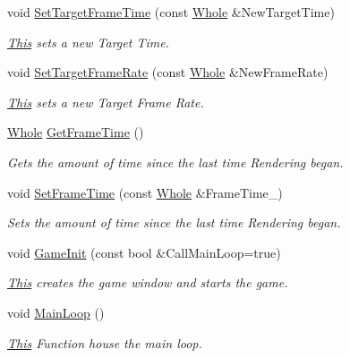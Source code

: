 \begin{DoxyCompactItemize}
void \hyperlink{classphys_1_1World_ad95b5a5ad73e0a05826b5bd834876333}{SetTargetFrameTime} (const \hyperlink{namespacephys_a460f6bc24c8dd347b05e0366ae34f34a}{Whole} \&NewTargetTime)
\begin{DoxyCompactList}\small\item\em \hyperlink{structThis}{This} sets a new Target Time. \item\end{DoxyCompactList}\item 
void \hyperlink{classphys_1_1World_a76dfcde35392291aafd6eb1a64b3c95c}{SetTargetFrameRate} (const \hyperlink{namespacephys_a460f6bc24c8dd347b05e0366ae34f34a}{Whole} \&NewFrameRate)
\begin{DoxyCompactList}\small\item\em \hyperlink{structThis}{This} sets a new Target Frame Rate. \item\end{DoxyCompactList}\item 
\hyperlink{namespacephys_a460f6bc24c8dd347b05e0366ae34f34a}{Whole} \hyperlink{classphys_1_1World_a348cebf8f15202a9916ac1b2400c63b1}{GetFrameTime} ()
\begin{DoxyCompactList}\small\item\em Gets the amount of time since the last time Rendering began. \item\end{DoxyCompactList}\item 
void \hyperlink{classphys_1_1World_a0168122baeb30d4b90ddecdda46c8fea}{SetFrameTime} (const \hyperlink{namespacephys_a460f6bc24c8dd347b05e0366ae34f34a}{Whole} \&FrameTime\_\-)
\begin{DoxyCompactList}\small\item\em Sets the amount of time since the last time Rendering began. \item\end{DoxyCompactList}\item 
void \hyperlink{classphys_1_1World_a21cc36be08a61f40619584d4c438936b}{GameInit} (const bool \&CallMainLoop=true)
\begin{DoxyCompactList}\small\item\em \hyperlink{structThis}{This} creates the game window and starts the game. \item\end{DoxyCompactList}\item 
void \hyperlink{classphys_1_1World_af1d9e36d43f5e50543fa2351a32c8362}{MainLoop} ()
\begin{DoxyCompactList}\small\item\em \hyperlink{structThis}{This} Function house the main loop. \item\end{DoxyCompactList}\item 

\end{DoxyCompactItemize}
